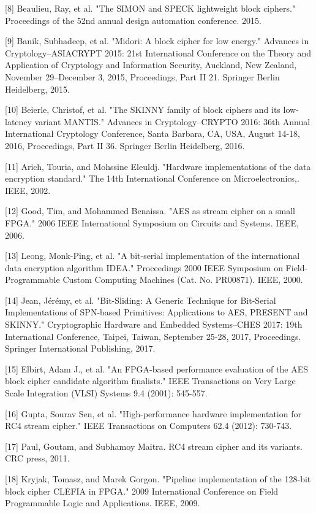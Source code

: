 \documentclass{ctexart}
\begin{document}
[8] Beaulieu, Ray, et al. "The SIMON and SPECK lightweight block ciphers." Proceedings of the 52nd annual design automation conference. 2015.

[9] Banik, Subhadeep, et al. "Midori: A block cipher for low energy." Advances in Cryptology–ASIACRYPT 2015: 21st International Conference on the Theory and Application of Cryptology and Information Security, Auckland, New Zealand, November 29--December 3, 2015, Proceedings, Part II 21. Springer Berlin Heidelberg, 2015.

[10] Beierle, Christof, et al. "The SKINNY family of block ciphers and its low-latency variant MANTIS." Advances in Cryptology–CRYPTO 2016: 36th Annual International Cryptology Conference, Santa Barbara, CA, USA, August 14-18, 2016, Proceedings, Part II 36. Springer Berlin Heidelberg, 2016.

[11] Arich, Touria, and Mohssine Eleuldj. "Hardware implementations of the data encryption standard." The 14th International Conference on Microelectronics,. IEEE, 2002.

[12] Good, Tim, and Mohammed Benaissa. "AES as stream cipher on a small FPGA." 2006 IEEE International Symposium on Circuits and Systems. IEEE, 2006.

[13] Leong, Monk-Ping, et al. "A bit-serial implementation of the international data encryption algorithm IDEA." Proceedings 2000 IEEE Symposium on Field-Programmable Custom Computing Machines (Cat. No. PR00871). IEEE, 2000.

[14] Jean, Jérémy, et al. "Bit-Sliding: A Generic Technique for Bit-Serial Implementations of SPN-based Primitives: Applications to AES, PRESENT and SKINNY." Cryptographic Hardware and Embedded Systems–CHES 2017: 19th International Conference, Taipei, Taiwan, September 25-28, 2017, Proceedings. Springer International Publishing, 2017.

[15] Elbirt, Adam J., et al. "An FPGA-based performance evaluation of the AES block cipher candidate algorithm finalists." IEEE Transactions on Very Large Scale Integration (VLSI) Systems 9.4 (2001): 545-557.

[16] Gupta, Sourav Sen, et al. "High-performance hardware implementation for RC4 stream cipher." IEEE Transactions on Computers 62.4 (2012): 730-743.

[17] Paul, Goutam, and Subhamoy Maitra. RC4 stream cipher and its variants. CRC press, 2011.

[18] Kryjak, Tomasz, and Marek Gorgon. "Pipeline implementation of the 128-bit block cipher CLEFIA in FPGA." 2009 International Conference on Field Programmable Logic and Applications. IEEE, 2009.
\end{document}
